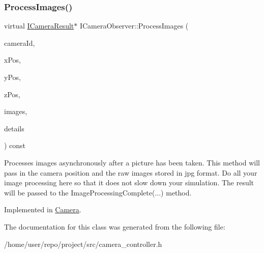 \subsubsection{\texorpdfstring{Process\+Images()}{ProcessImages()}}
{\footnotesize\ttfamily virtual \hyperlink{classICameraResult}{I\+Camera\+Result}$\ast$ I\+Camera\+Observer\+::\+Process\+Images (\begin{DoxyParamCaption}\item[{int}]{camera\+Id,  }\item[{double}]{x\+Pos,  }\item[{double}]{y\+Pos,  }\item[{double}]{z\+Pos,  }\item[{const std\+::vector$<$ \hyperlink{structRawCameraImage}{Raw\+Camera\+Image} $>$ \&}]{images,  }\item[{picojson\+::object \&}]{details }\end{DoxyParamCaption}) const\hspace{0.3cm}{\ttfamily [pure virtual]}}

Processes images asynchronously after a picture has been taken. This method will pass in the camera position and the raw images stored in jpg format. Do all your image processing here so that it does not slow down your simulation. The result will be passed to the Image\+Processing\+Complete(...) method. 

Implemented in \hyperlink{classCamera_a792611ad34a1c595b61b7c72ce1d5e32}{Camera}.



The documentation for this class was generated from the following file\+:\begin{DoxyCompactItemize}
\item 
/home/user/repo/project/src/camera\+\_\+controller.\+h\end{DoxyCompactItemize}
